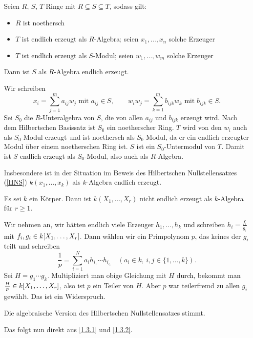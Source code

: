 \documentclass[a4paper,12pt]{scrbook}
\makeatletter
\theoremstyle{blah}
\theoremstyle{stz}
\renewcommand{\proofname}{Beweis}
\renewenvironment{proof}[1][\proofname]{\par
  \pushQED{\qed}%
  \normalfont \topsep6\p@\@plus6\p@\relax
  \trivlist
  \item[\hskip\labelsep
        \itshape
    #1\@addpunct{:}]\ignorespaces
}{%
  \popQED\endtrivlist\@endpefalse
}
\newcommand{\polyx}[1][n]{\ensuremath%
  [X_{1},\dotsc,X_{#1}]}
\makeatother
\begin{document}
\begin{lem}\label{1.3.1}
  Seien $R$, $S$, $T$ Ringe mit $R\subseteq S\subseteq T$, sodass gilt:
  \begin{itemize}
  \item $R$ ist noethersch
  \item $T$ ist endlich erzeugt als $R$-Algebra; seien $x_1,\dotsc,x_n$ solche Erzeuger
  \item $T$ ist endlich erzeugt als $S$-Modul; seien $w_1,\dotsc,w_m$ solche Erzeuger
  \end{itemize}
  Dann ist $S$ als $R$-Algebra endlich erzeugt.
\end{lem}
\begin{proof}
  Wir schreiben 
  \[ x_i=\displaystyle\sum_{j=1}^m a_{ij}w_j \text{ mit } a_{ij}\in S, \qquad
     w_iw_j=\displaystyle\sum_{k=1}^m b_{ijk}w_k \text { mit } b_{ijk}\in S. \]
  Sei $S_0$ die $R$-Unteralgebra von $S$, die von allen $a_{ij}$ und $b_{ijk}$ erzeugt wird. Nach dem Hilbertschen Basissatz ist
  $S_0$ ein noetherscher Ring. $T$ wird von den $w_i$ auch als $S_0$-Modul erzeugt und ist noethersch als $S_0$-Modul, da er ein
  endlich erzeugter Modul über einem noetherschen Ring ist. $S$ ist ein $S_0$-Untermodul von $T$. Damit ist $S$ endlich erzeugt
  als $S_0$-Modul, also auch als $R$-Algebra.
\end{proof}

Insbesondere ist in der Situation im Beweis des Hilbertschen Nullstellensatzes (\autoref{HNS}) $k(x_1,\dotsc,x_k)$ als
$k$-Algebra endlich erzeugt.

\begin{lem}\label{1.3.2}
  Es sei $k$ ein Körper. Dann ist $k(X_1,\dotsc,X_r)$ nicht endlich erzeugt als $k$-Algebra für $r\ge1$.
\end{lem}
\begin{proof}
  Wir nehmen an, wir hätten endlich viele Erzeuger $h_1,\dotsc,h_k$ und schreiben $h_i=\frac{f_i}{g_i}$ mit $f_i,g_i\in
  k\polyx[r]$. Dann wählen wir ein Primpolynom $p$, das keines der $g_i$ teilt und schreiben
  \[ \frac1p = \sum_{i=1}^N a_i h_{i_1}\dotsm h_{i_{l_i}} \quad (a_i\in k,\ i,j\in\{1,\dotsc,k\}). \]
  Sei $H=g_1\dotsm g_k$. Multipliziert man obige Gleichung mit $H$ durch, bekommt man $\frac{H}{p}\in k\polyx[r]$, also
  ist $p$ ein Teiler von $H$. Aber $p$ war teilerfremd zu allen $g_i$ gewählt. Das ist ein Widerspruch.
\end{proof}

\begin{prop}\label{1.3.3}
  Die algebraische Version des Hilbertschen Nullstellensatzes stimmt.
\end{prop}
\begin{proof}
  Das folgt nun direkt aus \autoref{1.3.1} und \autoref{1.3.2}.
\end{proof}
\end{document}
